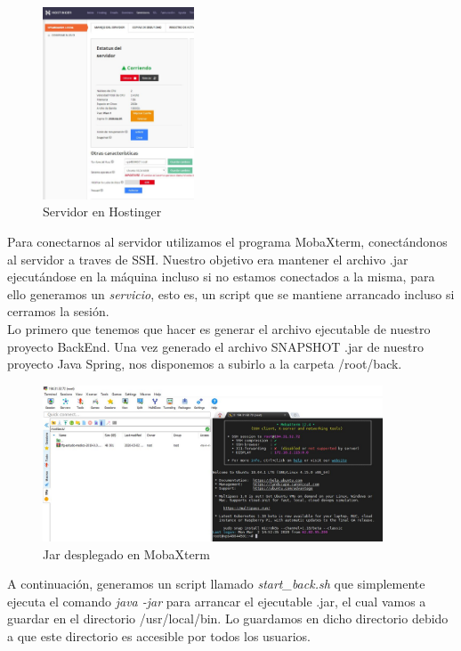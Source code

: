      \begin{figure}[h]
    \centering
     \includegraphics[width=0.4\textwidth]{images/servidorhostinger}
    \caption{Servidor en Hostinger}
    \end{figure}
    
    \FloatBarrier
    
    Para conectarnos al servidor utilizamos el programa MobaXterm, conectándonos al servidor a traves de SSH. Nuestro objetivo era mantener el archivo .jar ejecutándose en la máquina incluso si no estamos conectados a la misma, para ello generamos un \textit{servicio}, esto es, un script que se mantiene arrancado incluso si cerramos la sesión. \\
    \newline
    Lo primero que tenemos que hacer es generar el archivo ejecutable de nuestro proyecto BackEnd. Una vez generado el archivo SNAPSHOT .jar de nuestro proyecto Java Spring, nos disponemos a subirlo a la carpeta /root/back.
    
    \begin{figure}[h]
    \centering
     \includegraphics[width=0.9\textwidth]{images/jarback}
    \caption{Jar desplegado en MobaXterm}
    \end{figure}
    
    A continuación, generamos un script llamado \textit{start\_back.sh}  que simplemente ejecuta el comando \textit{java -jar} para arrancar el ejecutable .jar, el cual vamos a guardar en el directorio /usr/local/bin. Lo guardamos en dicho directorio debido a que este directorio es accesible por todos los usuarios.
    

